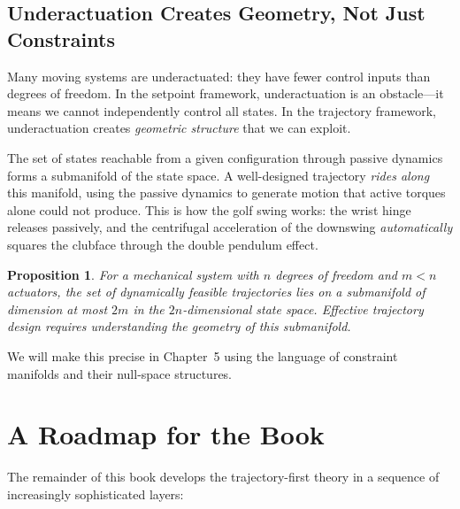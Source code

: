 \documentclass[12pt, openany]{book}
\theoremstyle{plain}
\newtheorem{proposition}{Proposition}[chapter]
\begin{document}
\subsection{Underactuation Creates Geometry, Not Just Constraints}

Many moving systems are underactuated: they have fewer control inputs than degrees
of freedom. In the setpoint framework, underactuation is an obstacle---it means we
cannot independently control all states. In the trajectory framework, underactuation
creates \emph{geometric structure} that we can exploit.

The set of states reachable from a given configuration through passive dynamics
forms a submanifold of the state space. A well-designed trajectory \emph{rides along}
this manifold, using the passive dynamics to generate motion that active torques
alone could not produce. This is how the golf swing works: the wrist hinge releases
passively, and the centrifugal acceleration of the downswing \emph{automatically}
squares the clubface through the double pendulum effect.

\begin{proposition}
  For a mechanical system with $n$ degrees of freedom and $m < n$ actuators, the
  set of dynamically feasible trajectories lies on a submanifold of dimension
  at most $2m$ in the $2n$-dimensional state space. Effective trajectory design
  requires understanding the geometry of this submanifold.
\end{proposition}

We will make this precise in Chapter~5 using the language of constraint manifolds
and their null-space structures.

\section{A Roadmap for the Book}

The remainder of this book develops the trajectory-first theory in a sequence of
increasingly sophisticated layers:
\end{document}
